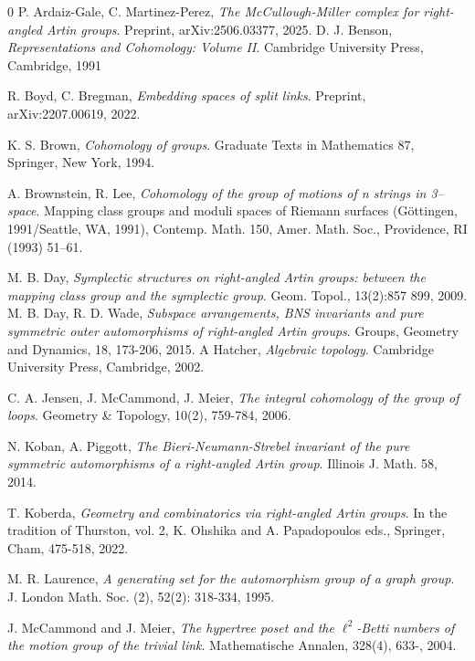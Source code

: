 \documentclass[a4paper]{amsart}
\theoremstyle{definition}
\theoremstyle{remark}
\begin{document}
\begin{thebibliography}{0}
 P. Ardaiz-Gale, C. Martinez-Perez, \textit{The McCullough-Miller complex for right-angled Artin groups}. Preprint, 	arXiv:2506.03377, 2025.
 D. J. Benson, \textit{Representations and Cohomology: Volume II}.  Cambridge University Press, Cambridge, 1991

 R. Boyd, C. Bregman, \textit{Embedding spaces of split links}. Preprint, {arXiv:}2207.00619, 2022.

 K. S. Brown, \textit{Cohomology of groups}. Graduate Texts in Mathematics 87, Springer, New York, 1994.

A. Brownstein, R. Lee, \textit{Cohomology of the group of motions of n strings in 3–space}.
 Mapping class groups and moduli spaces of Riemann surfaces (Göttingen,
1991/Seattle, WA, 1991), Contemp. Math. 150, Amer. Math. Soc., Providence, RI
(1993) 51–61.

 M. B. Day, \textit{Symplectic structures on right-angled Artin groups: between the mapping class group and the symplectic group}. Geom. Topol., 13(2):857 899, 2009.
 M. B. Day, R. D. Wade, \textit{ Subspace arrangements, BNS invariants and pure symmetric
outer automorphisms of right-angled Artin groups}. Groups, Geometry and Dynamics, 18,  173-206, 2015.
A Hatcher, \textit{Algebraic topology}. Cambridge University Press, Cambridge, 2002.

 C. A. Jensen, J. McCammond, J.  Meier,  \textit{The integral cohomology of the group of loops}. Geometry \& Topology, 10(2), 759-784, 2006.

 N. Koban, A. Piggott, \textit{The Bieri-Neumann-Strebel invariant of the pure symmetric
automorphisms of a right-angled Artin group}. Illinois J. Math. 58, 2014.

 T. Koberda, \textit{Geometry and combinatorics via right-angled Artin groups}.  In the tradition of Thurston, vol. 2, K. Ohshika and A. Papadopoulos eds., Springer, Cham, 475-518, 2022.

 M. R. Laurence, \textit{A generating set for the automorphism group of a graph group}.  J. London Math. Soc. (2), 52(2): 318-334, 1995.

 J. McCammond and J. Meier, \textit{The hypertree poset and the $\ell^2$-Betti numbers of the motion group of the trivial link}. Mathematische Annalen, 328(4), 633-, 2004.


\end{thebibliography}
\end{document}
